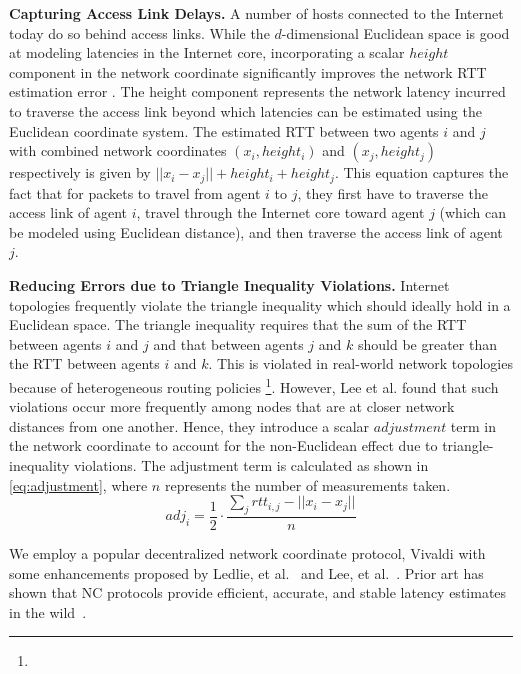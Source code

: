 \par \noindent \textbf{Capturing Access Link Delays. } A number of hosts connected to the Internet today do so behind access links. While the $d$-dimensional Euclidean space is good at modeling latencies in the Internet core, incorporating a scalar $height$ component in the network coordinate significantly improves the network RTT estimation error \cite{vivaldi}. The height component represents the network latency incurred to traverse the access link beyond which latencies can be estimated using the Euclidean coordinate system. The estimated RTT between two agents $i$ and $j$ with combined network coordinates $\left( x_i, height_i \right)$ and $\left( x_j, height_j \right)$ respectively is given by $|| x_i - x_j || + height_i + height_j$. This equation captures the fact that for packets to travel from agent $i$ to $j$, they first have to traverse the access link of agent $i$, travel through the Internet core toward agent $j$ (which can be modeled using Euclidean distance), and then traverse the access link of agent $j$. 

\par \noindent \textbf{Reducing Errors due to Triangle Inequality Violations. } Internet topologies frequently violate the triangle inequality which should ideally hold in a Euclidean space. The triangle inequality requires that the sum of the RTT between agents $i$ and $j$ and that between agents $j$ and $k$ should be greater than the RTT between agents $i$ and $k$. This is violated in real-world network topologies because of heterogeneous routing policies \footnote{}. However, Lee et al. \cite{lee2009suitability} found that such violations occur more frequently  among nodes that are at closer network distances from one another. Hence, they introduce a scalar $adjustment$ term in the network coordinate to account for the non-Euclidean effect due to triangle-inequality violations. The adjustment term is calculated as shown in \cref{eq:adjustment}, where $n$ represents the number of measurements taken.
\begin{equation}
adj_i = \dfrac{1}{2} \cdot \dfrac{\sum_{j} rtt_{i,j} - || x_i - x_j ||}{n}
\label{eq:adjustment}
\end{equation}

\par We employ a popular decentralized network coordinate protocol, Vivaldi \cite{vivaldi} with some enhancements proposed by Ledlie, et al.~\cite{ledlie2007network} and Lee, et al.~\cite{lee2009suitability}. Prior art has shown that NC protocols provide efficient, accurate, and stable latency estimates in the wild~\cite{ledlie2007network}.

